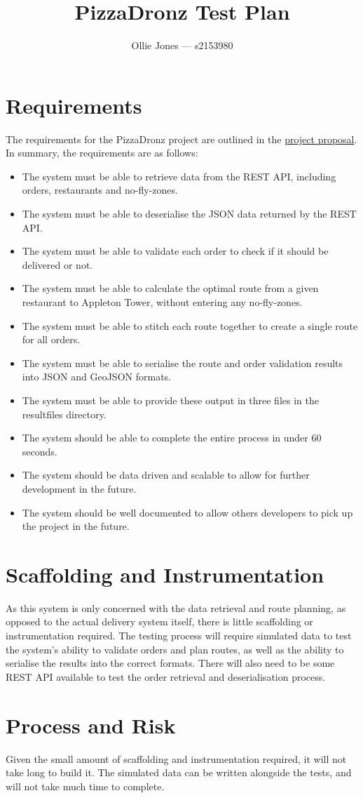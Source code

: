 \documentclass[11pt, a4paper]{article}
\title{PizzaDronz Test Plan}
\author{Ollie Jones — s2153980}
\date{}
\newcommand{\baseURL}{https://github.com/oathompsonjones/PizzaDronz}
\begin{document}
\maketitle

\section{Requirements}
    The requirements for the PizzaDronz project are outlined in the \href{\baseURL/blob/main/Project%20Proposal.pdf}{project proposal}.
    In summary, the requirements are as follows:
    \begin{itemize}
        \item The system must be able to retrieve data from the REST API, including orders, restaurants and no-fly-zones.
        \item The system must be able to deserialise the JSON data returned by the REST API.
        \item The system must be able to validate each order to check if it should be delivered or not.
        \item The system must be able to calculate the optimal route from a given restaurant to Appleton Tower, without entering any no-fly-zones.
        \item The system must be able to stitch each route together to create a single route for all orders.
        \item The system must be able to serialise the route and order validation results into JSON and GeoJSON formats.
        \item The system must be able to provide these output in three files in the resultfiles directory.
        \item The system should be able to complete the entire process in under 60 seconds.
        \item The system should be data driven and scalable to allow for further development in the future.
        \item The system should be well documented to allow others developers to pick up the project in the future.
    \end{itemize}

\section{Scaffolding and Instrumentation}
    As this system is only concerned with the data retrieval and route planning, as
        opposed to the actual delivery system itself, there is little scaffolding or
        instrumentation required.
    The testing process will require simulated data to test the system's ability to
        validate orders and plan routes, as well as the ability to serialise the
        results into the correct formats.
    There will also need to be some REST API available to test the order retrieval
        and deserialisation process.

\section{Process and Risk}
    Given the small amount of scaffolding and instrumentation required, it will not
        take long to build it.
    The simulated data can be written alongside the tests, and will not take much
        time to complete.
\end{document}
